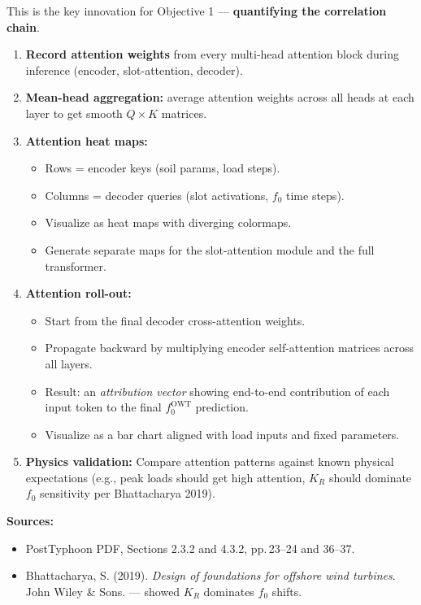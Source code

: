 \documentclass[11pt,a4paper]{article}
\begin{document}
This is the key innovation for Objective 1 --- \textbf{quantifying the correlation chain}.

\begin{enumerate}[noitemsep]
  \item \textbf{Record attention weights} from every multi-head attention block during
        inference (encoder, slot-attention, decoder).
  \item \textbf{Mean-head aggregation:} average attention weights across all heads
        at each layer to get smooth $Q \times K$ matrices.
  \item \textbf{Attention heat maps:}
    \begin{itemize}[noitemsep]
      \item Rows = encoder keys (soil params, load steps).
      \item Columns = decoder queries (slot activations, $f_0$ time steps).
      \item Visualize as heat maps with diverging colormaps.
      \item Generate separate maps for the slot-attention module and the full transformer.
    \end{itemize}
  \item \textbf{Attention roll-out:}
    \begin{itemize}[noitemsep]
      \item Start from the final decoder cross-attention weights.
      \item Propagate backward by multiplying encoder self-attention matrices across
            all layers.
      \item Result: an \textit{attribution vector} showing end-to-end contribution of
            each input token to the final $f_0^{\text{OWT}}$ prediction.
      \item Visualize as a bar chart aligned with load inputs and fixed parameters.
    \end{itemize}
  \item \textbf{Physics validation:} Compare attention patterns against known physical
        expectations (e.g., peak loads should get high attention, $K_R$ should dominate
        $f_0$ sensitivity per Bhattacharya 2019).
\end{enumerate}

\textbf{Sources:}
\begin{itemize}[noitemsep]
  \item PostTyphoon PDF, Sections 2.3.2 and 4.3.2, pp.\,23--24 and 36--37.
  \item Bhattacharya, S. (2019). \textit{Design of foundations for offshore wind
        turbines}. John Wiley \& Sons. --- showed $K_R$ dominates $f_0$ shifts.
\end{itemize}
\end{document}
